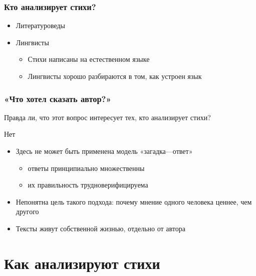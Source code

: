 \documentclass{beamer}
\begin{document}

\begin{frame}
\frametitle{Кто анализирует стихи?}

\begin{itemize}
\item Литературоведы
\item Лингвисты
\begin{itemize}
\item Стихи написаны на естественном языке
\item Лингвисты хорошо разбираются в том, как устроен язык
\end{itemize}
\end{itemize}

\end{frame}


\begin{frame}
\frametitle{«Что хотел сказать автор?»}

Правда ли, что этот вопрос интересует тех, кто анализирует стихи?

\begin{center}

{\Large Нет}

\end{center}

\begin{itemize}
\item Здесь не может быть применена модель «загадка—ответ»
\begin{itemize}
\item ответы принципиально множественны 
\item их правильность трудноверифицируема
\end{itemize} 
\item Непонятна цель такого подхода: почему мнение одного человека ценнее, чем другого
\item Тексты живут собственной жизнью, отдельно от автора
\end{itemize}

\end{frame}


\section{Как анализируют стихи}\label{sec:main2}
\end{document}
